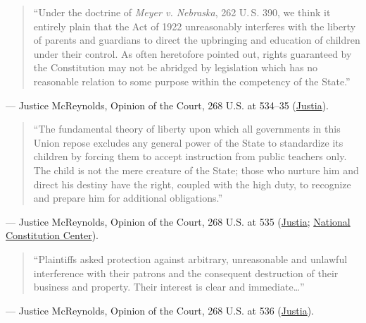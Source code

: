 \documentclass[12pt]{article}
\begin{document}
\begin{quote}
``Under the doctrine of \textit{Meyer v. Nebraska}, 262 U.\,S. 390, we think it entirely plain that the Act of 1922 unreasonably interferes with the liberty of parents and guardians to direct the upbringing and education of children under their control. As often heretofore pointed out, rights guaranteed by the Constitution may not be abridged by legislation which has no reasonable relation to some purpose within the competency of the State.''
\end{quote}
\noindent --- Justice McReynolds, Opinion of the Court, 268 U.S. at 534--35 (\href{https://supreme.justia.com/cases/federal/us/268/510/}{Justia}).

\begin{quote}
``The fundamental theory of liberty upon which all governments in this Union repose excludes any general power of the State to standardize its children by forcing them to accept instruction from public teachers only. The child is not the mere creature of the State; those who nurture him and direct his destiny have the right, coupled with the high duty, to recognize and prepare him for additional obligations.''
\end{quote}
\noindent --- Justice McReynolds, Opinion of the Court, 268 U.S. at 535 (\href{https://supreme.justia.com/cases/federal/us/268/510/}{Justia}; \href{https://constitutioncenter.org/the-constitution/supreme-court-case-library/pierce-v-society-of-sisters}{National Constitution Center}).

\begin{quote}
``Plaintiffs asked protection against arbitrary, unreasonable and unlawful interference with their patrons and the consequent destruction of their business and property. Their interest is clear and immediate\dots''
\end{quote}
\noindent --- Justice McReynolds, Opinion of the Court, 268 U.S. at 536 (\href{https://supreme.justia.com/cases/federal/us/268/510/}{Justia}).
\end{document}

